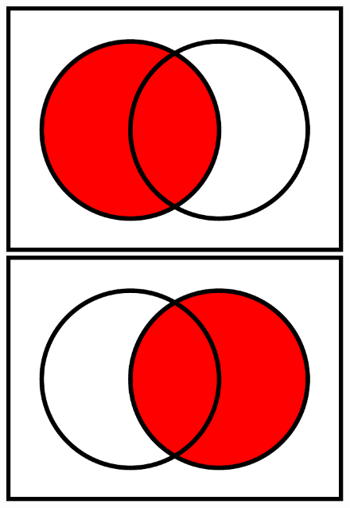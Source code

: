 \begin{figure}
  \begin{minipage}{0.3\textwidth}
    \includegraphics[width=\textwidth]{figs/A.pdf}
  \end{minipage}
  \hfill
  \begin{minipage}{0.3\textwidth}
    \includegraphics[width=\textwidth]{figs/B.pdf}
  \end{minipage}
  \hfill
  \begin{minipage}{0.3\textwidth}

\end{minipage}
\end{figure}
